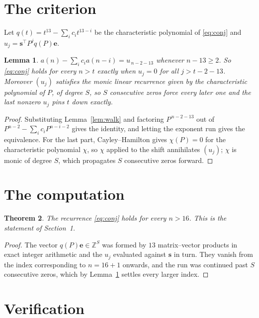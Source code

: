 \documentclass[11pt,a4paper]{article}
\theoremstyle{plain}
\newtheorem{theorem}{Theorem}
\newtheorem{lemma}[theorem]{Lemma}
\theoremstyle{definition}
\begin{document}
\section{The criterion}

Let $q(t)=t^{13}-\sum_i c_i t^{13-i}$ be the characteristic polynomial of
\eqref{eq:conj} and $u_j=\mathbf{s}^{\!\top}P^{j}q(P)\mathbf{e}$.

\begin{lemma}\label{lem:crit}
$a(n)-\sum_i c_i a(n-i)=u_{\,n-2-13}$ whenever $n-13\ge2$. So \eqref{eq:conj}
holds for every $n>t$ exactly when $u_j=0$ for all $j>t-2-13$. Moreover $(u_j)$
satisfies the monic linear recurrence given by the characteristic polynomial of $P$, of
degree $S$, so $S$ consecutive zeros force every later one and the last nonzero $u_j$ pins
$t$ down exactly.
\end{lemma}

\begin{proof}
Substituting Lemma~\ref{lem:walk} and factoring $P^{\,n-2-13}$ out of
$P^{n-2}-\sum_i c_i P^{n-i-2}$ gives the identity, and letting the exponent run gives the
equivalence. For the last part, Cayley--Hamilton gives $\chi(P)=0$ for the characteristic
polynomial $\chi$, so $\chi$ applied to the shift annihilates $(u_j)$; $\chi$ is monic of
degree $S$, which propagates $S$ consecutive zeros forward.
\end{proof}

\section{The computation}

\begin{theorem}
The recurrence \eqref{eq:conj} holds for every $n>16$. This is the statement of
Section~1.
\end{theorem}

\begin{proof}
The vector $q(P)\mathbf{e}\in\mathbb{Z}^{S}$ was formed by $13$ matrix--vector
products in exact integer arithmetic and the $u_j$ evaluated against $\mathbf{s}$ in turn.
They vanish from the index corresponding to $n=16+1$ onwards, and the run was continued
past $S$ consecutive zeros, which by Lemma~\ref{lem:crit} settles every larger index.
\end{proof}

\section{Verification}
\end{document}
